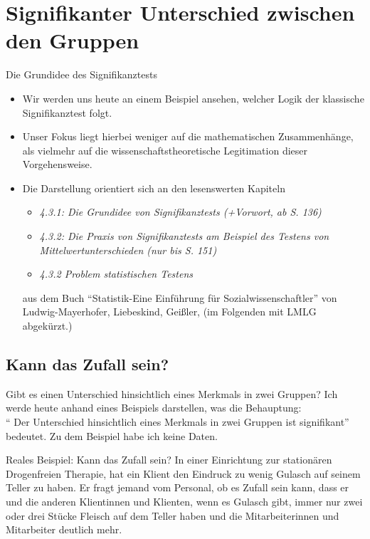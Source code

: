 \documentclass[usenames,dvipsnames,handout]{beamer}
\begin{document}
\section{Signifikanter Unterschied zwischen den Gruppen}

\begin{frame}{Die Grundidee des Signifikanztests}
\begin{itemize}
\item{Wir werden uns heute an einem Beispiel   ansehen, welcher Logik der klassische
Signifikanztest folgt. }\pause
\item{Unser Fokus liegt  hierbei weniger auf die mathematischen
Zusammenhänge, als vielmehr auf die wissenschaftstheoretische Legitimation dieser Vorgehensweise.}\pause
\item{Die Darstellung orientiert sich an den  lesenswerten Kapiteln 
\begin{itemize}
\item{\textit{4.3.1: Die Grundidee von Signifikanztests (+Vorwort, ab S. 136)}}
\item{\textit{4.3.2: Die Praxis von Signifikanztests am Beispiel des Testens von Mittelwertunterschieden (nur bis S. 151)}}
\item{\textit{4.3.2 Problem statistischen Testens}}
\end{itemize} aus dem Buch ``Statistik-Eine Einführung für Sozialwissenschaftler'' von Ludwig-Mayerhofer, Liebeskind, Geißler,
(im Folgenden mit LMLG abgekürzt.)
 }
\end{itemize}
\end{frame}
\subsection{Kann das Zufall sein?}


\begin{frame}{Gibt es einen Unterschied hinsichtlich eines Merkmals in zwei Gruppen?}
Ich  werde heute anhand eines Beispiels darstellen, was die Behauptung:\\ `` Der Unterschied 
 hinsichtlich eines Merkmals in zwei Gruppen ist signifikant'' bedeutet. Zu dem Beispiel habe ich keine Daten.
 \begin{block}{Reales Beispiel: Kann das Zufall sein?}
 In einer Einrichtung zur stationären Drogenfreien Therapie, hat ein Klient den Eindruck zu wenig Gulasch auf 
 seinem Teller zu haben. Er fragt jemand vom Personal, ob es Zufall sein kann, dass er und
 die anderen Klientinnen und Klienten, wenn es Gulasch gibt, immer nur zwei oder drei Stücke Fleisch auf dem Teller
 haben und die Mitarbeiterinnen und Mitarbeiter deutlich mehr.
 \end{block}
\end{frame}
\end{document}
